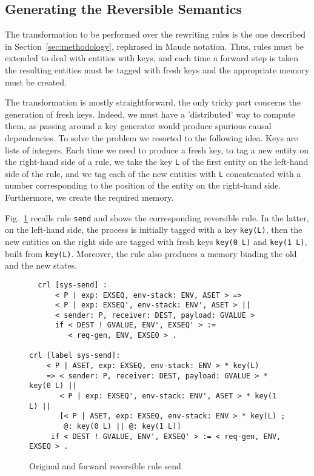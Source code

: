 \documentclass{article}[12pt,a4paper]
\theoremstyle{definition}
\begin{document}
\subsection{Generating the Reversible Semantics}
The transformation to be performed over the rewriting rules is the one
described in Section~\ref{sec:methodology}, rephrased in Maude
notation. Thus, rules must be extended to deal with entities with keys,
and each time a forward step is taken the resulting entities must
be tagged with fresh keys and the appropriate memory must be created.

The transformation is mostly straightforward, the only tricky part
concerns the generation of fresh keys. Indeed, we must have a
'distributed' way to compute them, as passing around a key generator
would produce spurious causal dependencies. To solve the problem we
resorted to the following idea. Keys are lists of integers. Each time
we need to produce a fresh key, to tag a new entity on the right-hand
side of a rule, we take the key \verb-L- of the first entity on the
left-hand side of the rule, and we tag each of the new entities with
\verb-L- concatenated with a number corresponding to the position of
the entity on the right-hand side.
Furthermore, we create the
required memory.

Fig.~\ref{fig:revsend} recalls rule \verb_send_ and shows the
corresponding reversible rule. In the latter, on the left-hand side,
the process is initially tagged with a key \verb_key(L)_, then the new
entities on the right side are tagged with fresh keys \verb_key(0 L)_
and \verb_key(1 L)_, built from \verb_key(L)_. Moreover, the rule also
produces a memory binding the old and the new states.

\begin{figure}[t]
  \centering
\begin{verbatim}
  crl [sys-send] :
      < P | exp: EXSEQ, env-stack: ENV, ASET > =>
      < P | exp: EXSEQ', env-stack: ENV', ASET > ||
      < sender: P, receiver: DEST, payload: GVALUE >
      if < DEST ! GVALUE, ENV', EXSEQ' > :=
         < req-gen, ENV, EXSEQ > .

crl [label sys-send]:
    < P | ASET, exp: EXSEQ, env-stack: ENV > * key(L)
    => < sender: P, receiver: DEST, payload: GVALUE > * key(0 L) || 
       < P | exp: EXSEQ', env-stack: ENV', ASET > * key(1 L) || 
       [< P | ASET, exp: EXSEQ, env-stack: ENV > * key(L) ;
        @: key(0 L) || @: key(1 L)]
     if < DEST ! GVALUE, ENV', EXSEQ' > := < req-gen, ENV, EXSEQ > .
\end{verbatim}
  \caption{Original and forward reversible rule send}
  \label{fig:revsend}
\end{figure}
\end{document}
